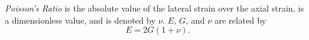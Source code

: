 \emph{Poisson's Ratio} is the absolute value of the lateral strain over the axial strain, is a dimensionless value, and is denoted by $\nu$. $E$, $G$, and $\nu$ are related by
\begin{equation}
E = 2G(1+\nu).
\end{equation}

\begin{comment}
\chapter{MORE INFORMATION ON EQUATIONS}

To demonstrate how an appendix should be inserted into the thesis we
have provided two appendices. This first appendix illustrates some
more advanced techniques to improve the appearance of your equations.
Below is a system of partial differential equations from a model for
cellular control by an external nutrient. The equations are
complicated and \LaTeX\ tends to allow them to run into each other. To
prevent this we have used the \verb+\vrule+ command to separate
them. Note this is an ordinary \TeX\ command and is not in L.\
Lamport's book \cite{LAM}. Furthermore, we have some complicated
boundary conditions that we needed to align, so we used the array
command, but to get the equations looking right we also needed the
\verb+\dfrac+ command instead of the \verb+\frac+ command. The
equations for our model are as follows:
\begin{eqnarray}
  \dot{U}_1(t) & = & \tilde f(W_1(t-T)) - U_1(t) + \gamma_1U_2(R\sigma,
   t){\vrule width 0in depth .1in},	\nonumber \\
  \dot{W}_1(t) & = & -\hat b_3W_1(t) + \gamma_3W_2(R\sigma,
   t){\vrule width 0in depth .1in},\nonumber \\
  \frac{\partial U_2}{\partial t} & = & D_1\nabla^2U_2 - U_2 - \tilde f(W_1
    (t-T)) - \gamma_1U_2(R\sigma,t){\vrule width 0in depth .1in},
	\label{sys2} \\
  \frac{\partial V_2}{\partial t} & = & D_2\nabla^2V_2 - b_2V_2 + c_0
    \bigl(U_2 + U_1(t)\bigr){\vrule width 0in depth .1in}, \nonumber \\
  \frac{\partial W_2}{\partial t} & = & D_3\nabla^2W_2 - b_3W_2 + (\hat b_3
    -b_3)W_1 - \gamma_3W_2(R\sigma,t) \nonumber \\
    &  & + k\left[\left[{\left(\frac{D_3}{r^2}\right)}\frac{d}{dr}\left(r^2
	   \frac{dh}{dr}\right) - b_3h\right]V_2(R,t) - h\dot V_2(R,t)
	   \right], \nonumber
\end{eqnarray}

\end{comment}
